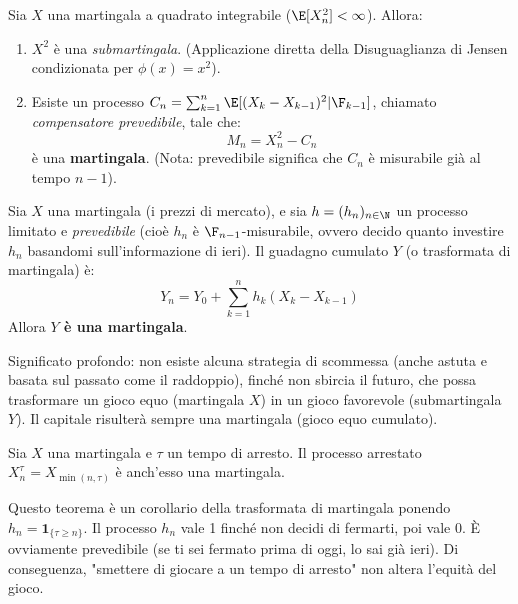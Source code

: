 \begin{theorem}
Sia $X$ una martingala a quadrato integrabile ($\E[X_n^2] < \infty$). Allora:
\begin{enumerate}
    \item $X^2$ è una \emph{submartingala}. (Applicazione diretta della Disuguaglianza di Jensen condizionata per $\phi(x)=x^2$).
    \item Esiste un processo $C_n = \sum_{k=1}^n \E[(X_k - X_{k-1})^2 | \F_{k-1}]$, chiamato \emph{compensatore prevedibile}, tale che:
    \[ M_n = X_n^2 - C_n \]
    è una \textbf{martingala}. (Nota: prevedibile significa che $C_n$ è misurabile già al tempo $n-1$).
\end{enumerate}
\end{theorem}

\begin{theorem}
Sia $X$ una martingala (i prezzi di mercato), e sia $h = (h_n)_{n \in \N}$ un processo limitato e \emph{prevedibile} (cioè $h_n$ è $\F_{n-1}$-misurabile, ovvero decido quanto investire $h_n$ basandomi sull'informazione di ieri).
Il guadagno cumulato $Y$ (o trasformata di martingala) è:
\[ Y_n = Y_0 + \sum_{k=1}^n h_k (X_k - X_{k-1}) \]
Allora \textbf{$Y$ è una martingala}.
\end{theorem}
\begin{spiegazione}
Significato profondo: non esiste alcuna strategia di scommessa (anche astuta e basata sul passato come il raddoppio), finché non sbircia il futuro, che possa trasformare un gioco equo (martingala $X$) in un gioco favorevole (submartingala $Y$). Il capitale risulterà sempre una martingala (gioco equo cumulato).
\end{spiegazione}

\begin{theorem}
Sia $X$ una martingala e $\tau$ un tempo di arresto. Il processo arrestato $X_n^\tau = X_{\min(n, \tau)}$ è anch'esso una martingala.
\end{theorem}
\begin{hint}
Questo teorema è un corollario della trasformata di martingala ponendo $h_n = \mathbf{1}_{\{\tau \ge n\}}$.
Il processo $h_n$ vale 1 finché non decidi di fermarti, poi vale 0. È ovviamente prevedibile (se ti sei fermato prima di oggi, lo sai già ieri). Di conseguenza, "smettere di giocare a un tempo di arresto" non altera l'equità del gioco.
\end{hint}
